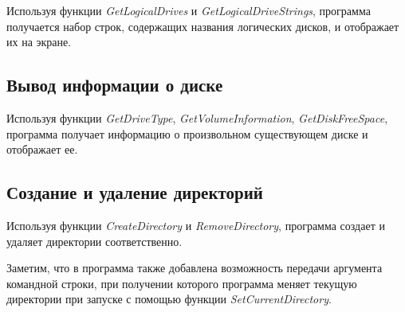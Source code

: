 \documentclass[a4paper,14pt]{extarticle}
\newcommand{\Code}[1]{\textit{#1}}
\begin{document}
Используя функции \Code{GetLogicalDrives} и \Code{GetLogicalDriveStrings},
программа получается набор строк, содержащих названия логических дисков, и
отображает их на экране.



\subsection{Вывод информации о диске}

Используя функции \Code{GetDriveType}, \Code{GetVolumeInformation},
\Code{GetDiskFreeSpace}, программа получает информацию о произвольном
существующем диске и отображает ее.



\subsection{Создание и удаление директорий}

Используя функции \Code{CreateDirectory} и \Code{RemoveDirectory}, программа
создает и удаляет директории соответственно.

Заметим, что в программа также добавлена возможность передачи аргумента
командной строки, при получении которого программа меняет текущую директории
при запуске с помощью функции \Code{SetCurrentDirectory}.

\end{document}
